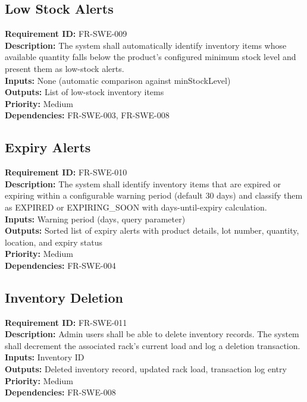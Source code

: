 \documentclass[12pt,a4paper]{report}
\begin{document}
\subsection{Low Stock Alerts}
\noindent\textbf{Requirement ID:} FR-SWE-009\\
\textbf{Description:} The system shall automatically identify inventory items whose available quantity falls below the product's configured minimum stock level and present them as low-stock alerts.\\
\textbf{Inputs:} None (automatic comparison against minStockLevel)\\
\textbf{Outputs:} List of low-stock inventory items\\
\textbf{Priority:} Medium\\
\textbf{Dependencies:} FR-SWE-003, FR-SWE-008

\subsection{Expiry Alerts}
\noindent\textbf{Requirement ID:} FR-SWE-010\\
\textbf{Description:} The system shall identify inventory items that are expired or expiring within a configurable warning period (default 30 days) and classify them as EXPIRED or EXPIRING\_SOON with days-until-expiry calculation.\\
\textbf{Inputs:} Warning period (days, query parameter)\\
\textbf{Outputs:} Sorted list of expiry alerts with product details, lot number, quantity, location, and expiry status\\
\textbf{Priority:} Medium\\
\textbf{Dependencies:} FR-SWE-004

\subsection{Inventory Deletion}
\noindent\textbf{Requirement ID:} FR-SWE-011\\
\textbf{Description:} Admin users shall be able to delete inventory records. The system shall decrement the associated rack's current load and log a deletion transaction.\\
\textbf{Inputs:} Inventory ID\\
\textbf{Outputs:} Deleted inventory record, updated rack load, transaction log entry\\
\textbf{Priority:} Medium\\
\textbf{Dependencies:} FR-SWE-008
\end{document}
